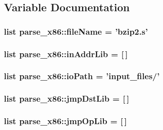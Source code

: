 \subsection{Variable Documentation}
\hypertarget{namespaceparse__x86_a955e505bf61e73978f2a0351a8481b65}{
\subsubsection[{fileName}]{\setlength{\rightskip}{0pt plus 5cm}list {\bf parse\_\-x86::fileName} = 'bzip2.s'}}
\label{namespaceparse__x86_a955e505bf61e73978f2a0351a8481b65}
\hypertarget{namespaceparse__x86_aeca34d9cbbf4caa2875e549339985223}{
\subsubsection[{inAddrLib}]{\setlength{\rightskip}{0pt plus 5cm}list {\bf parse\_\-x86::inAddrLib} = \mbox{[}$\,$\mbox{]}}}
\label{namespaceparse__x86_aeca34d9cbbf4caa2875e549339985223}
\hypertarget{namespaceparse__x86_ab11d9d1a0626bdc175b6c2ee03df263e}{
\subsubsection[{ioPath}]{\setlength{\rightskip}{0pt plus 5cm}list {\bf parse\_\-x86::ioPath} = 'input\_\-files/'}}
\label{namespaceparse__x86_ab11d9d1a0626bdc175b6c2ee03df263e}
\hypertarget{namespaceparse__x86_a02affd150cd87ae056585236c3217200}{
\subsubsection[{jmpDstLib}]{\setlength{\rightskip}{0pt plus 5cm}list {\bf parse\_\-x86::jmpDstLib} = \mbox{[}$\,$\mbox{]}}}
\label{namespaceparse__x86_a02affd150cd87ae056585236c3217200}
\hypertarget{namespaceparse__x86_a0fb61b722a1498e50bf52375a7fb2fa8}{
\subsubsection[{jmpOpLib}]{\setlength{\rightskip}{0pt plus 5cm}list {\bf parse\_\-x86::jmpOpLib} = \mbox{[}$\,$\mbox{]}}}
